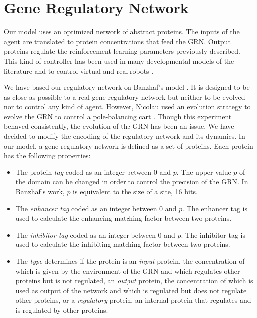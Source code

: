 \section{Gene Regulatory Network}
Our model uses an optimized network of abstract proteins. The inputs of the
agent are translated to protein concentrations that feed the GRN. Output
proteins regulate the reinforcement learning parameters previously described.
This kind of controller has been used in many developmental models of the
literature \cite{Joachimczak08, Doursat09, CussatBlanc2012a} and to control
virtual and real robots \cite{ziegler2001evolving, Nicolau10, Joachimczak10, CussatBlanc2012b}.

We have based our regulatory network on Banzhaf's model
\cite{Banzhaf03}. It is designed to be as close as possible to a real
gene regulatory network but neither to be evolved nor to control any kind of
agent. However, Nicolau used an evolution strategy to evolve the GRN to control
a pole-balancing cart \cite{Nicolau10}. Though this experiment behaved
consistently, the evolution of the GRN has been an issue. We have decided to
modify the encoding of the regulatory network and its dynamics. In our model, a
gene regulatory network is defined as a set of proteins. Each protein has the
following properties:

\begin{itemize}

\item The protein \emph{tag} coded as an integer between 0 and $p$. The
	upper value $p$ of the domain can be changed in order to control the
	precision of the GRN. In Banzhaf's work, $p$ is equivalent to the size
of a site, 16 bits. 

\item The \emph{enhancer tag} coded as an integer between 0 and $p$. The
	enhancer tag is used to calculate the enhancing matching factor
	between two proteins.

\item The \emph{inhibitor tag} coded as an integer between 0 and $p$. The
	inhibitor tag is used to calculate the inhibiting matching factor
	between two proteins.

\item The \emph{type} determines if the protein is an \emph{input} protein, the
	concentration of which is given by the environment of the GRN and which
	regulates other proteins but is not regulated, an \emph{output} protein,
	the concentration of which is used as output of the network and which is
	regulated but does not regulate other proteins, or a \emph{regulatory}
	protein, an internal protein that regulates and is regulated by other
	proteins.

\end{itemize}


